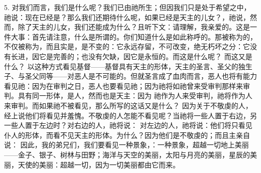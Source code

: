 5. 对我们而言，我们是什么呢？我们已由祂所生；但因我们只是处于希望之中，祂说：现在已经是？那么我们还期待什么呢，如果已经是天主的儿女？，祂说，然而，除了天主的儿女，我们还能成为什么？且听下文：请理解，我亲爱的。这是一件大事：首先请注意，什么是所谓的。你们知道什么是如此称呼的。那被称为的，不仅被称为，而且实是，是不变的：它永远存留，不可改变，绝无朽坏之分：它没有长进，因它是完善的；也没有欠缺，因它是永恒的。而这是什么呢？ 而这又是什么？ 以这种方式看见基督——基督具有天主的形体，天主的圣言、圣父的独生子、与圣父同等——对恶人是不可能的。但就圣言成了血肉而言，恶人也将有能力看见祂：因为在审判之日，恶人也要看见祂；因为祂将如祂曾来受审判那样来审判。具有同一形体，是人，然而也是天主：因为 祂作为人来受审判，祂将作为人来审判。而如果祂不被看见，那么所写的这话又是什么？ 因为关于不敬虔的人，经上说他们将看见并羞愧。不敬虔的人怎能不看见呢？当祂将一些人置于右边，另一些人置于左边时？对右边的人，祂将说： 对左边的人，祂将说：他们将只看见仆人的形体，而看不见天主的形体。为什么？因为他们是不敬虔的；而且主亲自说： 因此，我的弟兄们，我们要看见一种景象，：一种景象，超越一切地上美丽——金子、银子、树林与田野；海洋与天空的美丽，太阳与月亮的美丽，星辰的美丽，天使的美丽：超越一切，因为一切美丽都由它而来。\par

